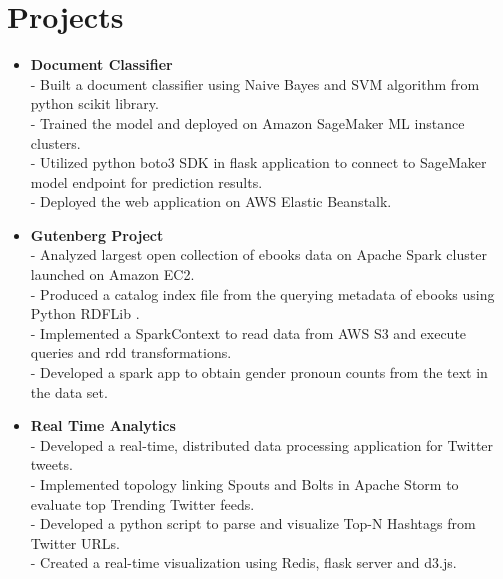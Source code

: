 \section {Projects}
\begin{itemize}



\item \textbf{Document Classifier} \\
 - Built a document classifier using Naive Bayes and SVM algorithm from python scikit library.\\
 - Trained the model and deployed on Amazon SageMaker ML instance clusters.\\
 - Utilized python boto3 SDK in flask application to connect to SageMaker model endpoint for prediction results.\\
 - Deployed the web application on AWS Elastic Beanstalk.

 \item \textbf{Gutenberg Project}\\
 - Analyzed largest open collection of ebooks data on Apache Spark cluster launched on Amazon EC2.\\
 - Produced a catalog index file from the querying metadata of ebooks using Python RDFLib .\\
 - Implemented a SparkContext to read data from AWS S3 and execute queries and rdd transformations.\\
 - Developed a spark app to obtain gender pronoun counts from the text in the data set.

\item \textbf{Real Time Analytics} \\
 - Developed a real-time, distributed data processing application for Twitter tweets.\\
 - Implemented topology linking Spouts and Bolts in Apache Storm to evaluate top Trending Twitter feeds. \\
 - Developed a python script to parse and visualize Top-N Hashtags from Twitter URLs.\\
 - Created a real-time visualization using Redis, flask server and d3.js.
 


\end{itemize}
